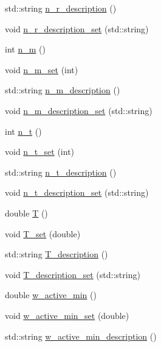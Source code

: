 \begin{DoxyCompactItemize}
std\+::string \hyperlink{class_config___settings_a8c3ebb61d80cb5badc1850eb13bfd771}{n\+\_\+r\+\_\+description} ()
\item 
void \hyperlink{class_config___settings_a82dbddc1dbdcef1113533e7f8c0f28ca}{n\+\_\+r\+\_\+description\+\_\+set} (std\+::string)
\item 
int \hyperlink{class_config___settings_aa0de2ef7676aee694198ede5e96f7dca}{n\+\_\+m} ()
\item 
void \hyperlink{class_config___settings_a3ed0c682ef8ee538075b4b61937819a7}{n\+\_\+m\+\_\+set} (int)
\item 
std\+::string \hyperlink{class_config___settings_a06222062da21105d4fc7a517fd8d09f3}{n\+\_\+m\+\_\+description} ()
\item 
void \hyperlink{class_config___settings_a7359dcac6b107a8ed1d3ebafc38b4329}{n\+\_\+m\+\_\+description\+\_\+set} (std\+::string)
\item 
int \hyperlink{class_config___settings_a77ad5b80da352bc85785e25232e80f1c}{n\+\_\+t} ()
\item 
void \hyperlink{class_config___settings_a9d3bda378eb9b3af6868c3aa231fda72}{n\+\_\+t\+\_\+set} (int)
\item 
std\+::string \hyperlink{class_config___settings_a097aa83ca9de02a23cef594673421dd9}{n\+\_\+t\+\_\+description} ()
\item 
void \hyperlink{class_config___settings_aaa3ee5ab1141691390e26887fd6c2c72}{n\+\_\+t\+\_\+description\+\_\+set} (std\+::string)
\item 
double \hyperlink{class_config___settings_a1ed40710ec225b2f91d275b4fc8f64ef}{T} ()
\item 
void \hyperlink{class_config___settings_ae5124cda8f87a2abb733912ad49264b3}{T\+\_\+set} (double)
\item 
std\+::string \hyperlink{class_config___settings_a0a851a218a87393dfe8710fae9a21115}{T\+\_\+description} ()
\item 
void \hyperlink{class_config___settings_aab5604b25a35978883a804e6a628c6b3}{T\+\_\+description\+\_\+set} (std\+::string)
\item 
double \hyperlink{class_config___settings_a2f8932f4f74b63a988918ac3904a690a}{w\+\_\+active\+\_\+min} ()
\item 
void \hyperlink{class_config___settings_a773c6dbd4fe5abbc8e3c09ebf895ba6f}{w\+\_\+active\+\_\+min\+\_\+set} (double)
\item 
std\+::string \hyperlink{class_config___settings_ab297a08dc48a30516eab5e6effe096e2}{w\+\_\+active\+\_\+min\+\_\+description} ()

\end{DoxyCompactItemize}
